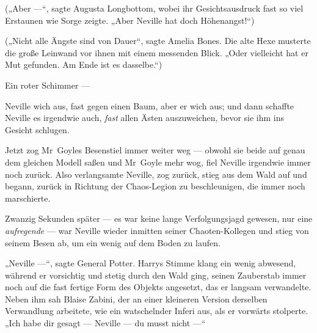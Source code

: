 („Aber —“, sagte Augusta Longbottom, wobei ihr Gesichtsausdruck fast so viel Erstaunen wie Sorge zeigte.
„Aber Neville hat doch Höhenangst!“)

(„Nicht alle Ängste sind von Dauer“, sagte Amelia Bones. Die alte Hexe musterte die große Leinwand vor ihnen mit einem messenden Blick.
„Oder vielleicht hat er Mut gefunden. Am Ende ist es dasselbe.“)

Ein roter Schimmer —

Neville wich aus, fast gegen einen Baum, aber er wich aus; und dann schaffte Neville es irgendwie auch, \emph{fast} allen Ästen auszuweichen, bevor sie ihm ins Gesicht schlugen.

Jetzt zog Mr~Goyles Besenstiel immer weiter weg — obwohl sie beide auf genau dem gleichen Modell saßen und Mr~Goyle mehr wog, fiel Neville irgendwie immer noch zurück. Also verlangsamte Neville, zog zurück, stieg aus dem Wald auf und begann, zurück in Richtung der Chaos-Legion zu beschleunigen, die immer noch marschierte.

Zwanzig Sekunden später — es war keine lange Verfolgungsjagd gewesen, nur eine \emph{aufregende} — war Neville wieder inmitten seiner Chaoten-Kollegen und stieg von seinem Besen ab, um ein wenig auf dem Boden zu laufen.

„Neville —“, sagte General Potter. Harrys Stimme klang ein wenig abwesend, während er vorsichtig und stetig durch den Wald ging, seinen Zauberstab immer noch auf die fast fertige Form des Objekts angesetzt, das er langsam verwandelte. Neben ihm sah Blaise Zabini, der an einer kleineren Version derselben Verwandlung arbeitete, wie ein watschelnder Inferi aus, als er vorwärts stolperte.
„Ich habe dir gesagt — Neville — du musst nicht —“

